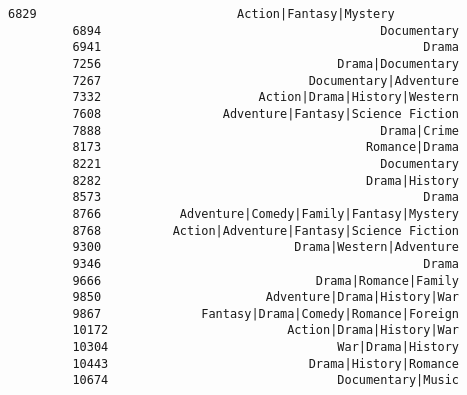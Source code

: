 \documentclass[11pt]{article}
\begin{document}
\begin{Verbatim}[commandchars=\\\{\}]
         6829                            Action|Fantasy|Mystery   
         6894                                       Documentary   
         6941                                             Drama   
         7256                                 Drama|Documentary   
         7267                             Documentary|Adventure   
         7332                      Action|Drama|History|Western   
         7608                 Adventure|Fantasy|Science Fiction   
         7888                                       Drama|Crime   
         8173                                     Romance|Drama   
         8221                                       Documentary   
         8282                                     Drama|History   
         8573                                             Drama   
         8766           Adventure|Comedy|Family|Fantasy|Mystery   
         8768          Action|Adventure|Fantasy|Science Fiction   
         9300                           Drama|Western|Adventure   
         9346                                             Drama   
         9666                              Drama|Romance|Family   
         9850                       Adventure|Drama|History|War   
         9867              Fantasy|Drama|Comedy|Romance|Foreign   
         10172                         Action|Drama|History|War   
         10304                                War|Drama|History   
         10443                            Drama|History|Romance   
         10674                                Documentary|Music   
         

\end{Verbatim}
\end{document}
